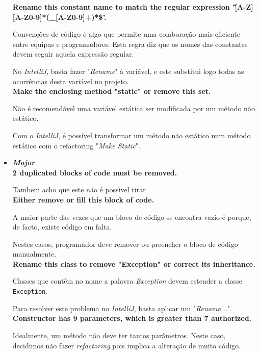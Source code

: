 \documentclass[a4paper]{report}
\begin{document}
\begin{itemize}
    \textbf{Rename this constant name to match the regular expression '\^[A-Z][A-Z0-9]*(\_[A-Z0-9]+)*\$'.}

    Convenções de código é algo que permite uma colaboração mais eficiente entre equipas e programadores. Esta regra diz que os nomes das constantes devem seguir aquela expressão regular.
    
    No \textit{IntelliJ}, basta fazer "\textit{Rename}" à variável, e este substitui logo todas as ocorrências desta variável no projeto.\\
    
    \textbf{Make the enclosing method "static" or remove this set.}
    
    Não é recomendável uma variável estática ser modificada por um método não estático.
    
    Com o \textit{IntelliJ}, é possível transformar um método não estático num método estático com o refactoring "\textit{Make Static}".\\
    
    \item \textit{\textbf{Major}}\\
    \textbf{2 duplicated blocks of code must be removed.} 
    
    Tambem acho que este não é possivel tirar\\
    
    \textbf{Either remove or fill this block of code.}
    
    A maior parte das vezes que um bloco de código se encontra vazio é porque, de facto, existe código em falta.
    
    Nestes casos, programador deve remover ou preencher o bloco de código manualmente.\\
    
    
    \textbf{Rename this class to remove "Exception" or correct its inheritance.}
    
    Classes que contêm no nome a palavra \textit{Exception} devem estender a classe \texttt{Exception}.
    
    Para resolver este problema no \textit{IntelliJ}, basta aplicar um "\textit{Rename...}".\\
    
    \textbf{Constructor has 9 parameters, which is greater than 7 authorized.}
    
    Idealmente, um método não deve ter tantos parâmetros.
    Neste caso, decidimos não fazer \textit{refactoring} pois implica a alteração de muito código.\\
    

\end{itemize}
\end{document}
